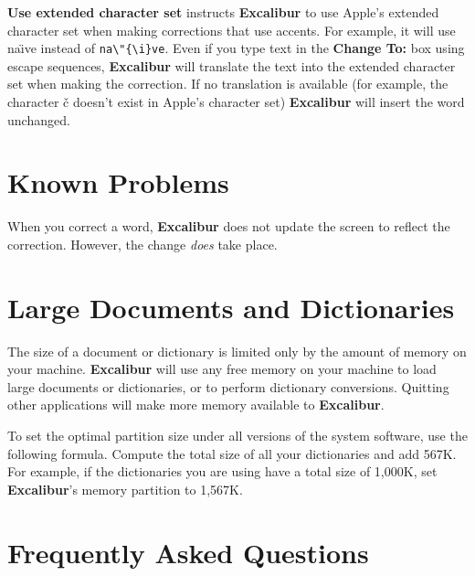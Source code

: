 \documentclass[11pt,titlepage]{article}
\newcommand{\ex}{\textbf{Excalibur}}
\begin{document}
\textbf{Use extended character set} instructs \ex{} to use Apple's
extended character set when making corrections that use accents.  For
example, it will use na\"{\i}ve instead of \verb+na\"{\i}ve+.  Even if
you type text in the \textbf{Change To:} box using escape sequences,
\ex{} will translate the text into the extended character set when
making the correction.  If no translation is available (for example,
the character \v{c} doesn't exist in Apple's character set) \ex{} will
insert the word unchanged.

\section{Known Problems}
\label{sec:problems}

When you correct a word, \ex{} does not update the screen to reflect
the correction. However, the change \emph{does} take place.

\section{Large Documents and Dictionaries}
\label{sec:large-docs}

The size of a document or dictionary is limited only by the amount of
memory on your machine.  \ex{} will use any free memory on your
machine to load large documents or dictionaries, or to perform
dictionary conversions.  Quitting other applications will make more
memory available to \ex.

To set the optimal partition size under all versions of the system
software, use the following formula.  Compute the total size of all
your dictionaries and add 567K.  For example, if the dictionaries you
are using have a total size of 1,000K, set \ex's memory partition to
1,567K.

\section{Frequently Asked Questions}
\label{seq:faq}
\end{document}
